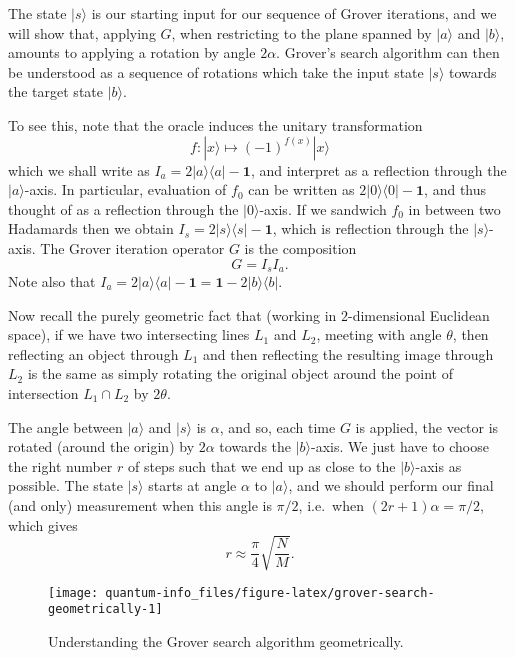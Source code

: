 \documentclass[fleqn]{article}
\begin{document}
The state \(|s\rangle\) is our starting input for our sequence of Grover iterations, and we will show that, applying \(G\), when restricting to the plane spanned by \(|a\rangle\) and \(|b\rangle\), amounts to applying a rotation by angle \(2\alpha\).
Grover's search algorithm can then be understood as a sequence of rotations which take the input state \(|s\rangle\) towards the target state \(|b\rangle\).

To see this, note that the oracle induces the unitary transformation
\[
  f\colon |x\rangle \mapsto (-1)^{f(x)}|x\rangle
\]
which we shall write as \(I_a = 2|a\rangle\langle a|-\mathbf{1}\), and interpret as a reflection through the \(|a\rangle\)-axis.
In particular, evaluation of \(f_0\) can be written as \(2|0\rangle\langle 0|-\mathbf{1}\), and thus thought of as a reflection through the \(|0\rangle\)-axis.
If we sandwich \(f_0\) in between two Hadamards then we obtain \(I_s = 2|s\rangle\langle s|-\mathbf{1}\), which is reflection through the \(|s\rangle\)-axis.
The Grover iteration operator \(G\) is the composition
\[
  G = I_s I_a.
\]
Note also that \(I_a = 2|a\rangle\langle a|-\mathbf{1}= \mathbf{1}-2|b\rangle\langle b|\).

Now recall the purely geometric fact that (working in \(2\)-dimensional Euclidean space), if we have two intersecting lines \(L_1\) and \(L_2\), meeting with angle \(\theta\), then reflecting an object through \(L_1\) and then reflecting the resulting image through \(L_2\) is the same as simply rotating the original object around the point of intersection \(L_1\cap L_2\) by \(2\theta\).

The angle between \(|a\rangle\) and \(|s\rangle\) is \(\alpha\), and so, each time \(G\) is applied, the vector is rotated (around the origin) by \(2\alpha\) towards the \(|b\rangle\)-axis.
We just have to choose the right number \(r\) of steps such that we end up as close to the \(|b\rangle\)-axis as possible.
The state \(|s\rangle\) starts at angle \(\alpha\) to \(|a\rangle\), and we should perform our final (and only) measurement when this angle is \(\pi/2\), i.e.~when \((2r+1)\alpha = \pi/2\), which gives
\[
  r \approx \frac{\pi}{4}\sqrt{\frac{N}{M}}.
\]

\begin{figure}[H]

{\centering \texttt{[image: quantum-info\_files/figure-latex/grover-search-geometrically-1]} 

}

\caption{Understanding the Grover search algorithm geometrically.}\label{fig:grover-search-geometrically}
\end{figure}
\end{document}
